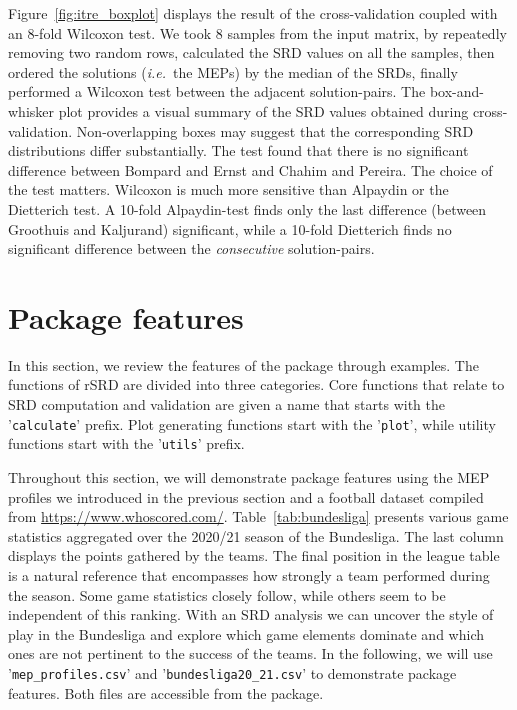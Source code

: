 Figure~\ref{fig:itre_boxplot} displays the result of the cross-validation coupled with an 8-fold Wilcoxon test. We took 8 samples from the input matrix, by repeatedly removing two random rows, calculated the SRD values on all the samples, then ordered the solutions (\textit{i.e.}\ the MEPs) by the median of the SRDs, finally performed a Wilcoxon test between the adjacent solution-pairs. The box-and-whisker plot provides a visual summary of the SRD values obtained during cross-validation. Non-overlapping boxes may suggest that the corresponding SRD distributions differ substantially. The test found that there is no significant difference between Bompard and Ernst and Chahim and Pereira. The choice of the test matters. Wilcoxon is much more sensitive than Alpaydin or the Dietterich test. A 10-fold Alpaydin-test finds only the last difference (between Groothuis and Kaljurand) significant, while a 10-fold Dietterich finds no significant difference between the \textit{consecutive} solution-pairs. %

\section{Package features}

In this section, we review the features of the package through examples. The functions of rSRD are divided into three categories. Core functions that relate to SRD computation and validation are given a name that starts with the '\texttt{calculate}' prefix. Plot generating functions start with the '\texttt{plot}', while utility functions start with the '\texttt{utils}' prefix.

Throughout this section, we will demonstrate package features using the MEP profiles we introduced in the previous section and a football dataset compiled from \url{https://www.whoscored.com/}. Table~\ref{tab:bundesliga} presents various game statistics aggregated over the 2020/21 season of the Bundesliga. The last column displays the points gathered by the teams. The final position in the league table is a natural reference that encompasses how strongly a team performed during the season. Some game statistics closely follow, while others seem to be independent of this ranking. With an SRD analysis we can uncover the style of play in the Bundesliga and explore which game elements dominate and which ones are not pertinent to the success of the teams. %
In the following, we will use '\texttt{mep\_profiles.csv}' and '\texttt{bundesliga20\_21.csv}' to demonstrate package features. Both files are accessible from the package.

